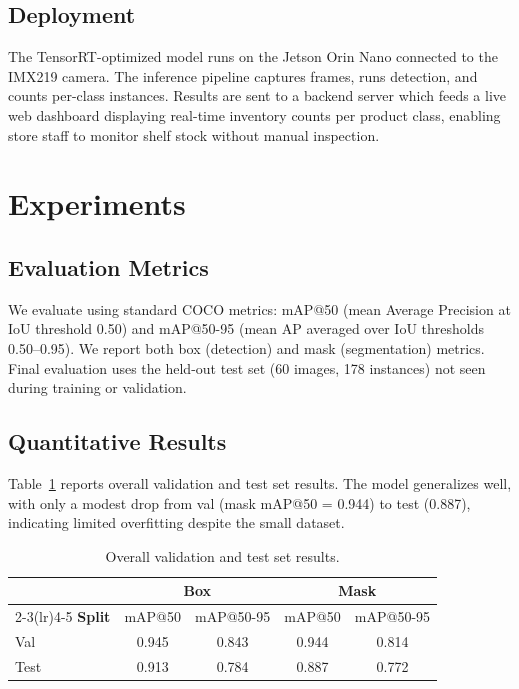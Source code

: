 \documentclass[10pt,twocolumn,letterpaper]{article}
\begin{document}
\subsection{Deployment}

The TensorRT-optimized model runs on the Jetson Orin Nano
connected to the IMX219 camera. The inference pipeline
captures frames, runs detection, and counts per-class
instances. Results are sent to a backend server which feeds
a live web dashboard displaying real-time inventory counts
per product class, enabling store staff to monitor shelf
stock without manual inspection.

\section{Experiments}

\subsection{Evaluation Metrics}

We evaluate using standard COCO metrics: mAP@50 (mean
Average Precision at IoU threshold 0.50) and mAP@50-95
(mean AP averaged over IoU thresholds 0.50--0.95). We
report both box (detection) and mask (segmentation) metrics.
Final evaluation uses the held-out test set (60 images,
178 instances) not seen during training or validation.

\subsection{Quantitative Results}

Table~\ref{tab:results} reports overall validation and test
set results. The model generalizes well, with only a modest
drop from val (mask mAP@50 = 0.944) to test (0.887),
indicating limited overfitting despite the small dataset.

\begin{table}[h]
\centering
\small
\begin{tabular}{lcccc}
\toprule
& \multicolumn{2}{c}{\textbf{Box}} &
  \multicolumn{2}{c}{\textbf{Mask}} \\
\cmidrule(lr){2-3}\cmidrule(lr){4-5}
\textbf{Split} & mAP@50 & mAP@50-95 & mAP@50 & mAP@50-95 \\
\midrule
Val  & 0.945 & 0.843 & 0.944 & 0.814 \\
Test & 0.913 & 0.784 & 0.887 & 0.772 \\
\bottomrule
\end{tabular}
\caption{Overall validation and test set results.}
\label{tab:results}
\end{table}
\end{document}
